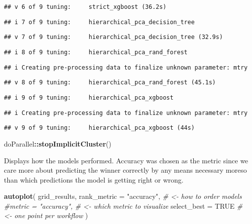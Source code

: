 \documentclass[
]{article}
\newenvironment{Shaded}{\begin{snugshade}}{\end{snugshade}}
\newcommand{\AttributeTok}[1]{\textcolor[rgb]{0.13,0.29,0.53}{#1}}
\newcommand{\CommentTok}[1]{\textcolor[rgb]{0.56,0.35,0.01}{\textit{#1}}}
\newcommand{\ConstantTok}[1]{\textcolor[rgb]{0.56,0.35,0.01}{#1}}
\newcommand{\FunctionTok}[1]{\textcolor[rgb]{0.13,0.29,0.53}{\textbf{#1}}}
\newcommand{\NormalTok}[1]{#1}
\newcommand{\SpecialCharTok}[1]{\textcolor[rgb]{0.81,0.36,0.00}{\textbf{#1}}}
\newcommand{\StringTok}[1]{\textcolor[rgb]{0.31,0.60,0.02}{#1}}
\begin{document}
\begin{verbatim}
## v 6 of 9 tuning:     strict_xgboost (36.2s)
\end{verbatim}

\begin{verbatim}
## i 7 of 9 tuning:     hierarchical_pca_decision_tree
\end{verbatim}

\begin{verbatim}
## v 7 of 9 tuning:     hierarchical_pca_decision_tree (32.9s)
\end{verbatim}

\begin{verbatim}
## i 8 of 9 tuning:     hierarchical_pca_rand_forest
\end{verbatim}

\begin{verbatim}
## i Creating pre-processing data to finalize unknown parameter: mtry
\end{verbatim}

\begin{verbatim}
## v 8 of 9 tuning:     hierarchical_pca_rand_forest (45.1s)
\end{verbatim}

\begin{verbatim}
## i 9 of 9 tuning:     hierarchical_pca_xgboost
\end{verbatim}

\begin{verbatim}
## i Creating pre-processing data to finalize unknown parameter: mtry
\end{verbatim}

\begin{verbatim}
## v 9 of 9 tuning:     hierarchical_pca_xgboost (44s)
\end{verbatim}

\begin{Shaded}
\begin{Highlighting}[]
\NormalTok{doParallel}\SpecialCharTok{::}\FunctionTok{stopImplicitCluster}\NormalTok{()}
\end{Highlighting}
\end{Shaded}

Displays how the models performed. Accuracy was chosen as the metric
since we care more about predicting the winner correctly by any means
necessary moreso than which predictions the model is getting right or
wrong.

\begin{Shaded}
\begin{Highlighting}[]
\FunctionTok{autoplot}\NormalTok{(}
\NormalTok{  grid\_results,}
  \AttributeTok{rank\_metric =} \StringTok{"accuracy"}\NormalTok{,  }\CommentTok{\# \textless{}{-} how to order models}
  \CommentTok{\#metric = "accuracy",       \# \textless{}{-} which metric to visualize}
  \AttributeTok{select\_best =} \ConstantTok{TRUE}     \CommentTok{\# \textless{}{-} one point per workflow}
\NormalTok{)}
\end{Highlighting}
\end{Shaded}
\end{document}
